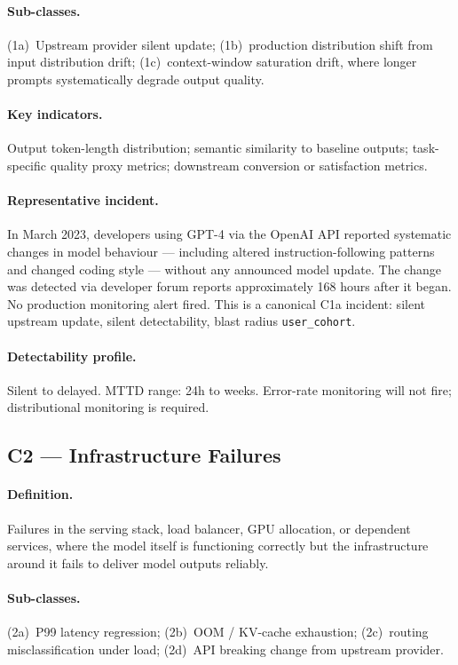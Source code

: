 \documentclass{article}
\begin{document}
\paragraph{Sub-classes.}
(1a)~Upstream provider silent update; (1b)~production distribution shift from
input distribution drift; (1c)~context-window saturation drift, where longer
prompts systematically degrade output quality.

\paragraph{Key indicators.}
Output token-length distribution; semantic similarity to baseline outputs;
task-specific quality proxy metrics; downstream conversion or satisfaction
metrics.

\paragraph{Representative incident.}
In March 2023, developers using GPT-4 via the OpenAI API reported systematic
changes in model behaviour --- including altered instruction-following patterns
and changed coding style --- without any announced model update.  The change
was detected via developer forum reports approximately 168 hours after it
began.  No production monitoring alert fired.  This is a canonical C1a
incident: silent upstream update, silent detectability, blast radius
\texttt{user\_cohort}.

\paragraph{Detectability profile.}
Silent to delayed.  MTTD range: 24h to weeks.  Error-rate monitoring will not
fire; distributional monitoring is required.

\subsection{C2 --- Infrastructure Failures}

\paragraph{Definition.}
Failures in the serving stack, load balancer, GPU allocation, or dependent
services, where the model itself is functioning correctly but the infrastructure
around it fails to deliver model outputs reliably.

\paragraph{Sub-classes.}
(2a)~P99 latency regression; (2b)~OOM / KV-cache exhaustion; (2c)~routing
misclassification under load; (2d)~API breaking change from upstream provider.
\end{document}
